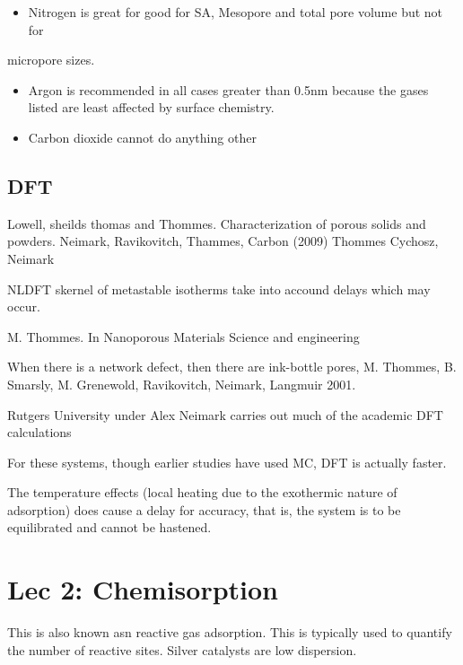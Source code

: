 \documentclass[12pt,a4paper,oneside,headinclude]{scrartcl}
\numberwithin{figure}{section}
\numberwithin{equation}{section}
\numberwithin{table}{section}
\renewenvironment{quote}{\begin{customblockquote}\list{}{\rightmargin=0em\leftmargin=0em}%
\item\relax\color{blockquote-text}\ignorespaces}{\unskip\unskip\endlist\end{customblockquote}}
\begin{document}
\begin{itemize}
\item Nitrogen is great for good for SA, Mesopore and total pore volume but not for
\end{itemize}
micropore sizes.
\begin{itemize}
\item Argon is recommended in all cases greater than 0.5nm because the gases listed
are least affected by surface chemistry.
\item Carbon dioxide cannot do anything other
\end{itemize}

\subsection{DFT}
\label{sec:orgfdbfc54}
Lowell, sheilds thomas and Thommes. Characterization of porous solids and
powders.
Neimark, Ravikovitch, Thammes, Carbon (2009)
Thommes Cychosz, Neimark

NLDFT skernel of metastable isotherms take into accound delays which may occur.

M. Thommes. In Nanoporous Materials Science and engineering

When there is a network defect, then there are ink-bottle pores, M. Thommes, B.
Smarsly, M. Grenewold, Ravikovitch, Neimark, Langmuir 2001.

\begin{quote}
Rutgers University under Alex Neimark carries out much of the academic DFT calculations
\end{quote}

\begin{quote}
For these systems, though earlier studies have used MC, DFT is actually faster.
\end{quote}

\begin{quote}
The temperature effects (local heating due to the exothermic nature of
adsorption) does cause a delay for accuracy, that is, the system is to be
equilibrated and cannot be hastened.
\end{quote}


\section{Lec 2: Chemisorption}
\label{sec:org47735fb}
This is also known asn reactive gas adsorption. This is typically used to
quantify the number of reactive sites. Silver catalysts are low dispersion.
\end{document}
